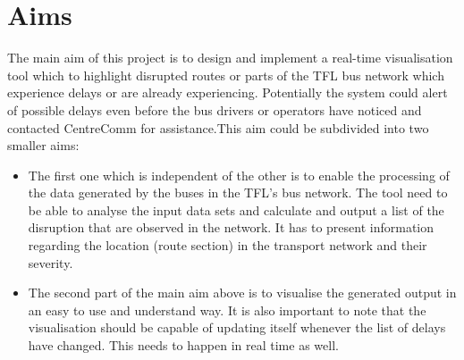 \section{Aims}
The main aim of this project is to design and implement a real-time visualisation tool which to highlight disrupted routes or parts of the TFL bus network which experience delays or are already experiencing. Potentially the system could alert of possible delays even before the bus drivers or operators have noticed and contacted CentreComm for assistance.This aim could be subdivided into two smaller aims:
\begin{itemize}
	\item The first one which is independent of the other is to enable the processing of the data generated by the buses in the TFL's bus network. The tool need to be able to analyse the input data sets and calculate and output a list of the disruption that are observed in the network. It has to present information regarding the location (route section) in the transport network and their severity.
	\item The second part of the main aim above is to visualise the generated output in an easy to use and understand way. It is also important to note that the visualisation should be capable of updating itself whenever the list of delays have changed. This needs to happen in real time as well.
\end{itemize}

